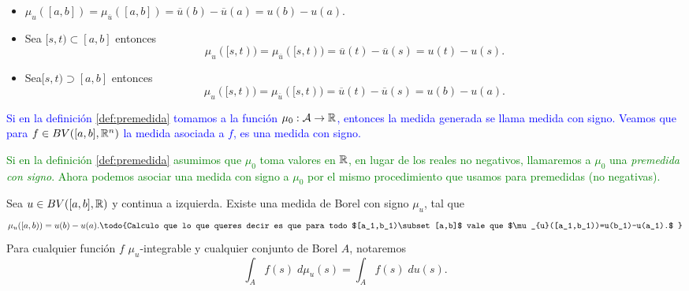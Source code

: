 \begin{obs}  \vphantom{a} \reversemarginpar {}
 
	\begin{itemize}
        \item $\mu_{u}([a,b])=\mu_{\overline{u}}([a,b])=\overline{u}(b)-\overline{u}(a)=u(b)-u(a)$.
		\item Sea $[s,t)\subset[a,b]$ entonces $$\mu_{u}([s,t))=\mu_{\overline{u}}([s,t))=\overline{u}(t)-\overline{u}(s)=u(t)-u(s).$$
		
		\item Sea$[s,t)\supset[a,b]$ entonces
		$$\mu_{u}([s,t))=\mu_{\overline{u}}([s,t))=\overline{u}(t)-\overline{u}(s)=u(b)-u(a).$$
	\end{itemize}
\end{obs}






 
\textcolor{blue}{Si en la definición \ref{def:premedida} tomamos a la función $\mu_0:\mathcal{A}\to \mathbb{R}$, entonces la medida generada se llama medida con signo. Veamos que para $f\in BV([a,b],\mathbb{R}^n)$ la medida asociada a $f$, es una medida con signo.}
\reversemarginpar
{}

\textcolor{green}{
 Si en la definición \ref{def:premedida} asumimos que $\mu_0$ toma valores en $\mathbb{R}$, en lugar de los reales no negativos, llamaremos  a $\mu_0$ una \emph{premedida con signo}. Ahora podemos asociar una medida con signo a $\mu_0$ por el mismo procedimiento que usamos para premedidas (no negativas). }
 


\begin{thm} \label{Thm:medidas}
    	Sea $u\in BV([a,b],\mathbb{R})$ y continua a izquierda. Existe una medida de Borel con signo $\mu_{u}$, tal que $$\mu_{u}([a,b))=u(b)-u(a).\textrm{\todo{Calculo que lo que queres decir es que para todo $[a_1,b_1)\subset [a,b]$ vale que $\mu_{u}([a_1,b_1))=u(b_1)-u(a_1).$ }}$$  Para cualquier función $f$ $\mu_{u}$-integrable  y cualquier conjunto de Borel $A$, notaremos
	$$\int_{A}f(s)\;d\mu_{u}(s)=\int_{A}f(s)\;du(s).$$  
\end{thm}





